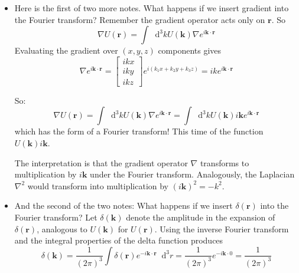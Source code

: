 \documentclass[11pt, a4paper]{article}
\newcommand{\diff}{\mathop{}\!\mathrm{d}} %
\renewcommand{\vec}[1]{\bm{#1}} %
\renewcommand{\r}{\vec{r}}
\renewcommand{\grad}{\nabla}
\begin{document}
\begin{itemize}
	\item Here is the first of two more notes. What happens if we insert gradient into the Fourier transform? Remember the gradient operator acts only on $ \r $. So
	\begin{equation*}
		\grad U(\r) = \int \diff^{3}k U(\vec{k}) \grad e^{i \vec{k}\cdot \r}
	\end{equation*}
	Evaluating the gradient over $ (x, y, z) $ components gives
	\begin{equation*}
		\grad e^{i \vec{k}\cdot \r} = 
		\begin{bmatrix}
			ikx\\
			iky\\
			ikz
		\end{bmatrix}
		e^{i(k_{1}x + k_{2}y + k_{3}z)} = ik e^{i\vec{k}\cdot \r}
	\end{equation*}
	
	So:
	\begin{equation*}
		\grad U(\r) = \int \diff^{3}k U(\vec{k}) \grad e^{i \vec{k}\cdot \r} = \int \diff^{3}k U(\vec{k})i \vec{k} e^{i \vec{k}\cdot \r}
	\end{equation*}
	which has the form of a Fourier transform! This time of the function $ U(\vec{k})i \vec{k} $. 
	
	The interpretation is that the gradient operator $ \grad $ transforms to multiplication by $ i\vec{k} $ under the Fourier transform. Analogously, the Laplacian $ \nabla^{2} $ would transform into multiplication by $ (i\vec{k})^{2} = - k^{2} $. 
	
	
	\item And the second of the two notes: What happens if we insert $ \delta(\r) $ into the Fourier transform? Let $ \delta(\vec{k}) $ denote the amplitude in the expansion of $ \delta(\r) $, analogous to $ U(\vec{k}) $ for $ U(\r) $. Using the inverse Fourier transform and the integral properties of the delta function produces
	\begin{equation*}
		\delta (\vec{k}) = \frac{1}{(2\pi)^{3}} \int \delta(\r) e^{-i\vec{k}\cdot\r}\diff^{3}r = \frac{1}{(2\pi)^{3}} e^{-i\vec{k}\cdot 0} = \frac{1}{(2\pi)^{3}}
	\end{equation*}
\end{itemize}
\end{document}
